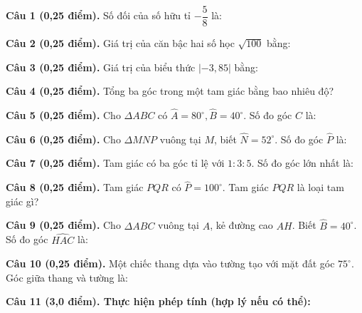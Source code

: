\documentclass[12pt,a4paper]{article}
\begin{document}
\vspace{1.5mm}
\noindent\textbf{Câu 1 (0,25 điểm).} Số đối của số hữu tỉ $-\dfrac{5}{8}$ là: \par\vspace{2.3mm}
\noindent\textbf{Câu 2 (0,25 điểm).} Giá trị của căn bậc hai số học $\sqrt{100}$ bằng: \par\vspace{2.3mm}
\noindent\textbf{Câu 3 (0,25 điểm).} Giá trị của biểu thức $|-3{,}85|$ bằng: \par\vspace{2.3mm}
\noindent\textbf{Câu 4 (0,25 điểm).} Tổng ba góc trong một tam giác bằng bao nhiêu độ? \par\vspace{2.3mm}
\noindent\textbf{Câu 5 (0,25 điểm).} Cho $\Delta ABC$ có $\widehat{A} = 80^\circ, \widehat{B} = 40^\circ$. Số đo góc $\widehat{C}$ là: \par\vspace{2.3mm}
\noindent\textbf{Câu 6 (0,25 điểm).} Cho $\Delta MNP$ vuông tại $M$, biết $\widehat{N} = 52^\circ$. Số đo góc $\widehat{P}$ là: \par\vspace{2.3mm}
\noindent\textbf{Câu 7 (0,25 điểm).} Tam giác có ba góc tỉ lệ với $1 : 3 : 5$. Số đo góc lớn nhất là: \par\vspace{2.3mm}
\noindent\textbf{Câu 8 (0,25 điểm).} Tam giác $PQR$ có $\widehat{P} = 100^\circ$. Tam giác $PQR$ là loại tam giác gì? \par\vspace{2.3mm}
\noindent\textbf{Câu 9 (0,25 điểm).} Cho $\Delta ABC$ vuông tại $A$, kẻ đường cao $AH$. Biết $\widehat{B} = 40^\circ$. Số đo góc $\widehat{HAC}$ là: \par\vspace{2.3mm}
\noindent\textbf{Câu 10 (0,25 điểm).} Một chiếc thang dựa vào tường tạo với mặt đất góc $75^\circ$. Góc giữa thang và tường là: \par\vspace{2.3mm}
\vspace{0.2mm}
\noindent\textbf{Câu 11 (3,0 điểm). Thực hiện phép tính (hợp lý nếu có thể):}
\vspace{0.8mm}
\end{document}
